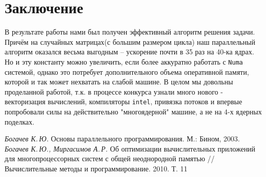 \documentclass[12pt,a4paper]{article}
\begin{document}
\section{Заключение}

В результате работы нами был получен эффективный алгоритм решения задачи. Причём на случайных матрицах(с большим размером цикла) наш параллельный алгоритм оказался весьма выгодным -- ускорение почти в 35 раз на 40-ка ядрах. Но и эту константу можно увеличить, если более аккуратно работать с \texttt{Numa} системой, однако это потребует дополнительного объема оперативной памяти, которой и так может нехватать на слабой машине. В целом мы довольны проделанной работой, т.к. в процессе конкурса узнали много нового - векторизация вычислений, компиляторы \texttt{intel}, привязка потоков и впервые попробовали силы на действительно "многоядерной" машине, а не на 4-х ядерных поделках.

\begin{thebibliography}{99}
\textit{Богачев К.\,Ю. } Основы параллельного программирования. М.: Бином, 2003.
\textit{Богачев К.\,Ю., Миргасимов А.\,Р.} Об оптимизации вычислительных приложений для многопроцессорных систем с общей неоднородной памятью // Вычислительные методы и программирование. 2010. Т. 11
\end{thebibliography}
\end{document}
